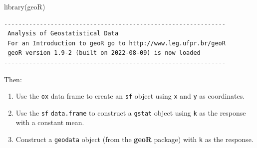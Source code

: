 \documentclass[
  letterpaper,
  DIV=11,
  numbers=noendperiod]{scrartcl}
\newenvironment{Shaded}{\begin{snugshade}}{\end{snugshade}}
\newcommand{\AttributeTok}[1]{\textcolor[rgb]{0.40,0.45,0.13}{#1}}
\newcommand{\CommentTok}[1]{\textcolor[rgb]{0.37,0.37,0.37}{#1}}
\newcommand{\DecValTok}[1]{\textcolor[rgb]{0.68,0.00,0.00}{#1}}
\newcommand{\FunctionTok}[1]{\textcolor[rgb]{0.28,0.35,0.67}{#1}}
\newcommand{\NormalTok}[1]{\textcolor[rgb]{0.00,0.23,0.31}{#1}}
\newcommand{\OtherTok}[1]{\textcolor[rgb]{0.00,0.23,0.31}{#1}}
\newcommand{\SpecialCharTok}[1]{\textcolor[rgb]{0.37,0.37,0.37}{#1}}
\newcommand{\StringTok}[1]{\textcolor[rgb]{0.13,0.47,0.30}{#1}}
\providecommand{\tightlist}{%
  \setlength{\itemsep}{0pt}\setlength{\parskip}{0pt}}\usepackage{longtable,booktabs,array}
\begin{document}
\begin{Shaded}
\begin{Highlighting}[]
\FunctionTok{library}\NormalTok{(geoR)}
\end{Highlighting}
\end{Shaded}

\begin{verbatim}
--------------------------------------------------------------
 Analysis of Geostatistical Data
 For an Introduction to geoR go to http://www.leg.ufpr.br/geoR
 geoR version 1.9-2 (built on 2022-08-09) is now loaded
--------------------------------------------------------------
\end{verbatim}

\begin{Shaded}
\end{Shaded}

Then:

\begin{enumerate}
\def\labelenumi{\arabic{enumi}.}
\tightlist
\item
  Use the \texttt{ox} data frame to create an \texttt{sf} object using
  \texttt{x} and \texttt{y} as coordinates.
\item
  Use the \texttt{sf} \texttt{data.frame} to construct a \texttt{gstat}
  object using \texttt{k} as the response with a constant mean.
\item
  Construct a \texttt{geodata} object (from the \textbf{geoR} package)
  with \texttt{k} as the response.
\end{enumerate}
\end{document}
